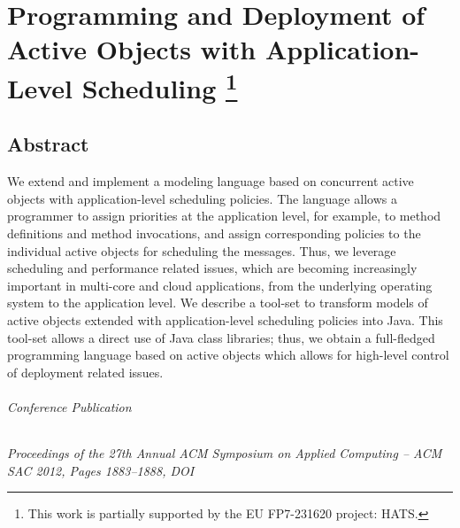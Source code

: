 
\chapter[Application-Level Scheduling]{Programming and Deployment of Active Objects with Application-Level Scheduling%
\footnote{This work is partially supported by the EU FP7-231620 project: HATS.}}
% 
\label{ch:p01:ch01}
% 

\section*{Abstract}
We extend and implement a modeling language based on concurrent active objects with application-level
scheduling policies.
The language allows a programmer to assign priorities at the application level, for example,
to method definitions and method invocations, and assign corresponding  policies to the individual active objects
for scheduling the messages.
Thus, we   leverage scheduling and performance related issues,
which are becoming increasingly important in multi-core and cloud  applications, from the underlying operating system to the application level.
We describe a tool-set to transform models of active objects extended with application-level
scheduling policies  into Java.
This tool-set allows a direct  use of Java class libraries; thus,  we
obtain  a full-fledged programming language
based on active objects which allows for high-level control of deployment related issues.

\subparagraph*{Conference Publication}
\emph{Proceedings of the 27th Annual ACM Symposium on Applied Computing -- ACM SAC 2012, Pages 1883--1888, DOI }


